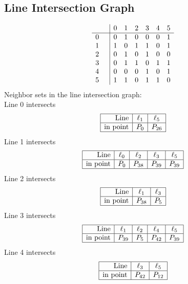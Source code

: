 \documentclass{article}
\begin{document}
{\subsection*{Line Intersection Graph}
{\arraycolsep=1pt
$$
\begin{array}{rr|*{6}r}
 &  & 0 & 1 & 2 & 3 & 4 & 5\\
\hline
0 &  & 0 & 1 & 0 & 0 & 0 & 1\\
1 &  & 1 & 0 & 1 & 1 & 0 & 1\\
2 &  & 0 & 1 & 0 & 1 & 0 & 0\\
3 &  & 0 & 1 & 1 & 0 & 1 & 1\\
4 &  & 0 & 0 & 0 & 1 & 0 & 1\\
5 &  & 1 & 1 & 0 & 1 & 1 & 0\\
\end{array}
$$
}%
Neighbor sets in the line intersection graph:\\
Line 0 intersects 
$$
\begin{array}{|r*{2}{|c}|}
\hline
\mbox{Line}  & \ell_{1} & \ell_{5}\\
\hline
\mbox{in point}  & P_{0} & P_{26}\\
\hline
\end{array}
$$
Line 1 intersects 
$$
\begin{array}{|r*{4}{|c}|}
\hline
\mbox{Line}  & \ell_{0} & \ell_{2} & \ell_{3} & \ell_{5}\\
\hline
\mbox{in point}  & P_{0} & P_{38} & P_{39} & P_{39}\\
\hline
\end{array}
$$
Line 2 intersects 
$$
\begin{array}{|r*{2}{|c}|}
\hline
\mbox{Line}  & \ell_{1} & \ell_{3}\\
\hline
\mbox{in point}  & P_{38} & P_{5}\\
\hline
\end{array}
$$
Line 3 intersects 
$$
\begin{array}{|r*{4}{|c}|}
\hline
\mbox{Line}  & \ell_{1} & \ell_{2} & \ell_{4} & \ell_{5}\\
\hline
\mbox{in point}  & P_{39} & P_{5} & P_{42} & P_{39}\\
\hline
\end{array}
$$
Line 4 intersects 
$$
\begin{array}{|r*{2}{|c}|}
\hline
\mbox{Line}  & \ell_{3} & \ell_{5}\\
\hline
\mbox{in point}  & P_{42} & P_{12}\\
\hline
\end{array}
$$}
\end{document}
